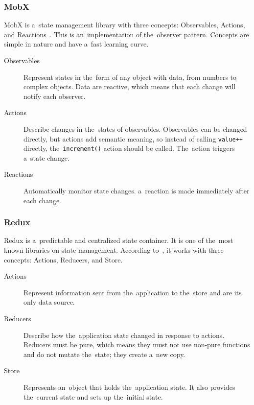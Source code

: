 \subsubsection{MobX}

MobX is a~state management library with three concepts: Observables, Actions, and Reactions~\cite{a2022_mobxdart}.
This is an~implementation of the~observer pattern.
Concepts are simple in nature and have a~fast learning curve.

\begin{description}
    \item[Observables] Represent states in the~form of any object with data, from numbers to complex objects.
    Data are reactive, which means that each change will notify each observer.
    \item[Actions] Describe changes in the~states of observables. Observables can be changed directly, but actions add semantic meaning, so instead of calling \texttt{value++} directly, the~\texttt{increment()} action should be called. The~action triggers a~state change.
    \item[Reactions] Automatically monitor state changes. a~reaction is made immediately after each change.
\end{description}

\subsubsection{Redux}

Redux is a~predictable and centralized state container.
It is one of the~most known libraries on state management.
According to~\cite{brianegan_2021_fluttercommunityreduxdart}, it works with three concepts: Actions, Reducers, and Store.

\begin{description}
    \item[Actions] Represent information sent from the~application to the~store and are its only data source.
    \item[Reducers] Describe how the~application state changed in response to actions.
    Reducers must be pure, which means they must not use non-pure functions and do not mutate the~state; they create a~new copy.
    \item[Store] Represents an~object that holds the~application state.
    It also provides the~current state and sets up the~initial state.
\end{description}


